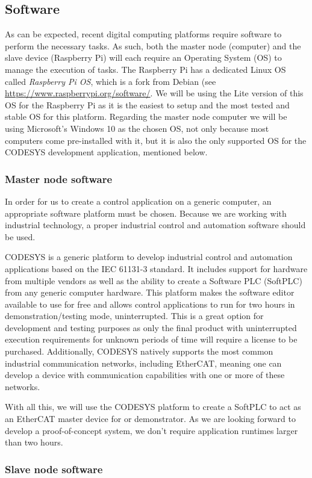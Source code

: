 \subsection{Software} \label{sec:proposed-software}

As can be expected, recent digital computing platforms require software to perform the necessary tasks.
As such, both the master node (computer) and the slave device (Raspberry Pi) will each require an Operating System (OS) to manage the execution of tasks.
The Raspberry Pi has a dedicated Linux OS called \emph{Raspberry Pi OS}, which is a fork from Debian (see \url{https://www.raspberrypi.org/software/}.
We will be using the Lite version of this OS for the Raspberry Pi as it is the easiest to setup and the most tested and stable OS for this platform.
Regarding the master node computer we will be using Microsoft's Windows 10 as the chosen OS, not only because most computers come pre-installed with it, but it is also the only supported OS for the CODESYS development application, mentioned below.

\subsubsection{Master node software}

In order for us to create a control application on a generic computer, an appropriate software platform must be chosen.
Because we are working with industrial technology, a proper industrial control and automation software should be used.

CODESYS is a generic platform to develop industrial control and automation applications based on the IEC 61131-3 standard.
It includes support for hardware from multiple vendors as well as the ability to create a Software PLC (SoftPLC) from any generic computer hardware.
This platform makes the software editor available to use for free and allows control applications to run for two hours in demonstration/testing mode, uninterrupted.
This is a great option for development and testing purposes as only the final product with uninterrupted execution requirements for unknown periods of time will require a license to be purchased.
Additionally, CODESYS natively supports the most common industrial communication networks, including EtherCAT, meaning one can develop a device with communication capabilities with one or more of these networks.

With all this, we will use the CODESYS platform to create a SoftPLC to act as an EtherCAT master device for or demonstrator.
As we are looking forward to develop a proof-of-concept system, we don't require application runtimes larger than two hours.

\subsubsection{Slave node software}




